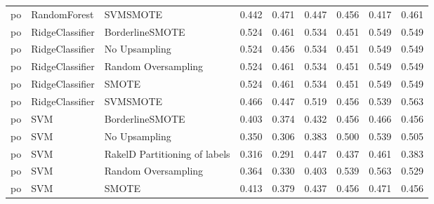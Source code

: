 \begin{tabular}{lllllllll}
      po &                    RandomForest &                      SVMSMOTE & 0.442 &                     0.471 &                 0.447 &                  0.456 &                                   0.417 &     0.461 \\
      po &                 RidgeClassifier &               BorderlineSMOTE & 0.524 &                     0.461 &                 0.534 &                  0.451 &                                   0.549 &     0.549 \\
      po &                 RidgeClassifier &                 No Upsampling & 0.524 &                     0.456 &                 0.534 &                  0.451 &                                   0.549 &     0.549 \\
      po &                 RidgeClassifier &           Random Oversampling & 0.524 &                     0.461 &                 0.534 &                  0.451 &                                   0.549 &     0.549 \\
      po &                 RidgeClassifier &                         SMOTE & 0.524 &                     0.461 &                 0.534 &                  0.451 &                                   0.549 &     0.549 \\
      po &                 RidgeClassifier &                      SVMSMOTE & 0.466 &                     0.447 &                 0.519 &                  0.456 &                                   0.539 &     0.563 \\
      po &                             SVM &               BorderlineSMOTE & 0.403 &                     0.374 &                 0.432 &                  0.456 &                                   0.466 &     0.456 \\
      po &                             SVM &                 No Upsampling & 0.350 &                     0.306 &                 0.383 &                  0.500 &                                   0.539 &     0.505 \\
      po &                             SVM & RakelD Partitioning of labels & 0.316 &                     0.291 &                 0.447 &                  0.437 &                                   0.461 &     0.383 \\
      po &                             SVM &           Random Oversampling & 0.364 &                     0.330 &                 0.403 &                  0.539 &                                   0.563 &     0.529 \\
      po &                             SVM &                         SMOTE & 0.413 &                     0.379 &                 0.437 &                  0.456 &                                   0.471 &     0.456 \\

\end{tabular}

